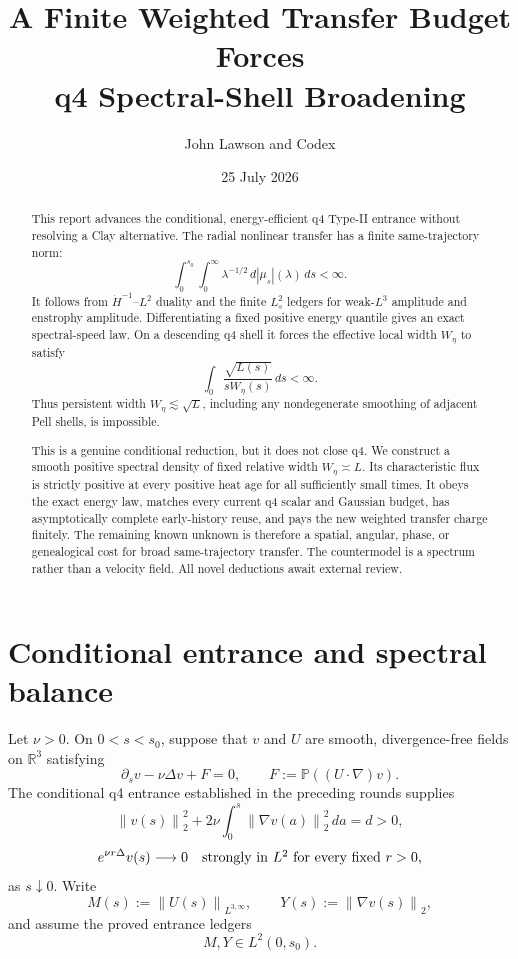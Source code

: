 \documentclass[11pt]{article}
\title{A Finite Weighted Transfer Budget Forces\\
q4 Spectral-Shell Broadening}
\author{John Lawson and Codex}
\date{25 July 2026}
\theoremstyle{remark}
\newcommand{\R}{\mathbb R}
\newcommand{\Pp}{\mathbb P}
\newcommand{\norm}[1]{\left\|#1\right\|}
\begin{document}
\maketitle

\begin{abstract}
This report advances the conditional, energy-efficient q4 Type-II
entrance without resolving a Clay alternative.  The radial nonlinear
transfer has a finite same-trajectory norm:
\[
 \int_0^{s_0}\int_0^\infty
 \lambda^{-1/2}\,d|\mu_s|(\lambda)\,ds<\infty.
\]
It follows from \(\dot H^{-1}\)--\(L^2\) duality and the finite
\(L_s^2\) ledgers for weak-\(L^3\) amplitude and enstrophy amplitude.
Differentiating a fixed positive energy quantile gives an exact
spectral-speed law.  On a descending q4 shell it forces the effective
local width \(W_\eta\) to satisfy
\[
 \int_0\frac{\sqrt{L(s)}}{sW_\eta(s)}\,ds<\infty.
\]
Thus persistent width \(W_\eta\lesssim\sqrt L\), including any
nondegenerate smoothing of adjacent Pell shells, is impossible.

This is a genuine conditional reduction, but it does not close q4.
We construct a smooth positive spectral density of fixed relative width
\(W_\eta\asymp L\).  Its characteristic flux is strictly positive at
every positive heat age for all sufficiently small times.  It obeys the
exact energy law, matches every current q4 scalar and Gaussian budget,
has asymptotically complete early-history reuse, and pays the new
weighted transfer charge finitely.  The remaining known unknown is
therefore a spatial, angular, phase, or genealogical cost for broad
same-trajectory transfer.  The countermodel is a spectrum rather than a
velocity field.  All novel deductions await external review.
\end{abstract}

\section{Conditional entrance and spectral balance}

Let \(\nu>0\).  On \(0<s<s_0\), suppose that \(v\) and \(U\) are smooth,
divergence-free fields on \(\R^3\) satisfying
\begin{equation}
\label{eq:evolution}
 \partial_s v-\nu\Delta v+F=0,
 \qquad
 F:=\Pp((U\cdot\nabla)v).
\end{equation}
The conditional q4 entrance established in the preceding rounds supplies
\begin{equation}
\label{eq:energy}
 \norm{v(s)}_2^2+
 2\nu\int_0^s\norm{\nabla v(a)}_2^2\,da=d>0,
\end{equation}
\begin{equation}
\label{eq:heat-boundary}
 e^{\nu r\Delta}v(s)\longrightarrow0
 \quad\hbox{strongly in \(L^2\) for every fixed \(r>0\),}
\end{equation}
as \(s\downarrow0\).  Write
\begin{equation}
\label{eq:MY}
 M(s):=\norm{U(s)}_{L^{3,\infty}},
 \qquad
 Y(s):=\norm{\nabla v(s)}_2,
\end{equation}
and assume the proved entrance ledgers
\begin{equation}
\label{eq:L2-ledgers}
 M,Y\in L^2(0,s_0).
\end{equation}
\end{document}
